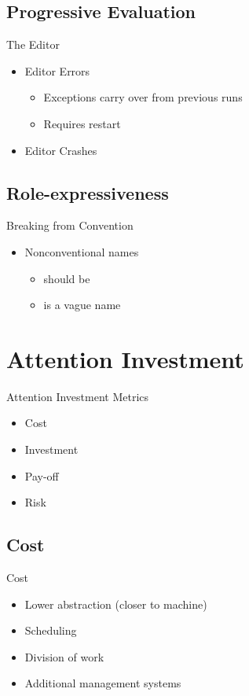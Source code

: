 \subsection{Progressive Evaluation}
\begin{frame}{\secname}{\subsecname}
	The Editor
	\begin{itemize}
		\item Editor Errors
		\begin{itemize}
			\item Exceptions carry over from previous runs
			\item Requires restart
		\end{itemize}
		\item Editor Crashes
	\end{itemize}
\end{frame}

\subsection{Role-expressiveness}
\begin{frame}{\secname}{\subsecname}
	Breaking from Convention
	\begin{itemize}
		\item Nonconventional names
		\begin{itemize}
			\item {} should be 
			\item {} is a vague name
		\end{itemize}
	\end{itemize}
\end{frame}

\section{Attention Investment}
\begin{frame}{\secname}{\subsecname}
	Attention Investment Metrics
	\begin{itemize}
		\item Cost
		\item Investment
		\item Pay-off
		\item Risk
	\end{itemize}
\end{frame}

\subsection{Cost}
\begin{frame}{\secname}{\subsecname}
	Cost
	\begin{itemize}
		\item Lower abstraction (closer to machine)
		\item Scheduling
		\item Division of work
		\item Additional management systems
	\end{itemize}
\end{frame}

